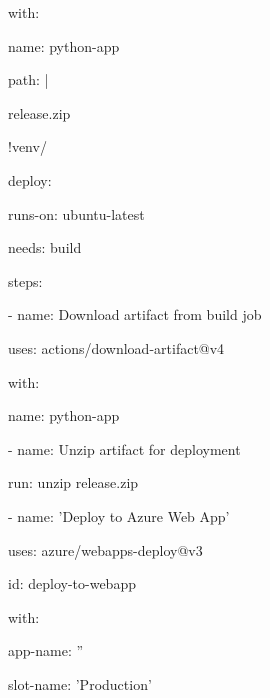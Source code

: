         with:

          name: python-app

          path: |

            release.zip

            !venv/

  deploy:

    runs-on: ubuntu-latest

    needs: build

    steps:

      - name: Download artifact from build job

        uses: actions/download-artifact@v4

        with:

          name: python-app

      - name: Unzip artifact for deployment

        run: unzip release.zip

      - name: 'Deploy to Azure Web App'

        uses: azure/webapps-deploy@v3

        id: deploy-to-webapp

        with:

          app-name: ''

          slot-name: 'Production'
 